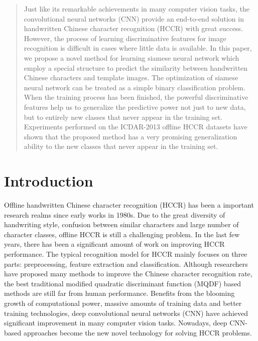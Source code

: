 \documentclass[conference]{IEEEtran}
\begin{document}
\begin{abstract}
Just like its remarkable achievements in many computer vision tasks, the convolutional neural networks (CNN) provide an end-to-end solution in handwritten Chinese character recognition (HCCR) with great success. However, the process of learning discriminative features for image recognition is difficult in cases where little data is available. In this paper, we propose a novel method for learning siamese neural network which employ a special structure to predict the similarity between handwritten Chinese characters and template images. The optimization of siamese neural network can be treated as a simple binary classification problem. When the training process has been finished, the powerful discriminative features help us to generalize the predictive power not just to new data, but to entirely new classes that never appear in the training set. Experiments performed on the ICDAR-2013 offline HCCR datasets have shown that the proposed method has a very promising generalization ability to the new classes that never appear in the training set.
\end{abstract}





%
\IEEEpeerreviewmaketitle



\section{Introduction}
\label{intro}
Offline handwritten Chinese character recognition (HCCR) has been a important research realms since early works in 1980s\cite{kimura1987modified}. Due to the great diversity of handwriting style, confusion between similar characters and large number of character classes, offline HCCR is still a challenging problem. In the last few years, there has been a significant amount of work on improving HCCR performance. The typical recognition model for HCCR mainly focuses on three parts: preprocessing, feature extraction and classification. Although researchers have proposed many methods to improve the Chinese character recognition rate, the best traditional modified quadratic discriminant function (MQDF) based methods are still far from human performance. Benefits from the blooming growth of computational power, massive amounts of training data and better training technologies, deep convolutional neural networks (CNN)\cite{krizhevsky2012imagenet} have achieved significant improvement in many computer vision tasks. Nowadays, deep CNN-based approaches become the new novel technology for solving HCCR problems.
\end{document}
